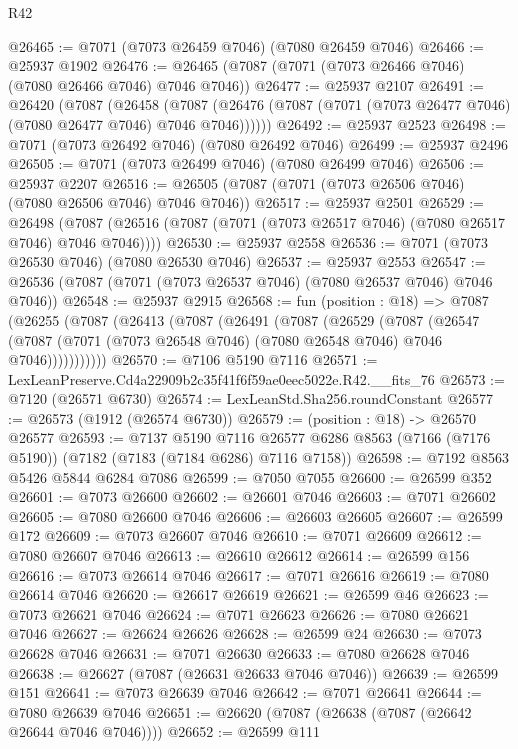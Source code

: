 \begin{lexlean}{R42}
\begin{coremodule}
{@26465 := @7071 (@7073 @26459 @7046) (@7080 @26459 @7046)
@26466 := @25937 @1902
@26476 := @26465 (@7087 (@7071 (@7073 @26466 @7046) (@7080 @26466 @7046) @7046 @7046))
@26477 := @25937 @2107
@26491 := @26420
    (@7087
      (@26458
        (@7087 (@26476 (@7087 (@7071 (@7073 @26477 @7046) (@7080 @26477 @7046) @7046 @7046))))))
@26492 := @25937 @2523
@26498 := @7071 (@7073 @26492 @7046) (@7080 @26492 @7046)
@26499 := @25937 @2496
@26505 := @7071 (@7073 @26499 @7046) (@7080 @26499 @7046)
@26506 := @25937 @2207
@26516 := @26505 (@7087 (@7071 (@7073 @26506 @7046) (@7080 @26506 @7046) @7046 @7046))
@26517 := @25937 @2501
@26529 := @26498
    (@7087 (@26516 (@7087 (@7071 (@7073 @26517 @7046) (@7080 @26517 @7046) @7046 @7046))))
@26530 := @25937 @2558
@26536 := @7071 (@7073 @26530 @7046) (@7080 @26530 @7046)
@26537 := @25937 @2553
@26547 := @26536 (@7087 (@7071 (@7073 @26537 @7046) (@7080 @26537 @7046) @7046 @7046))
@26548 := @25937 @2915
@26568 := fun (position : @18) =>
  @7087
    (@26255
      (@7087
        (@26413
          (@7087
            (@26491
              (@7087
                (@26529
                  (@7087
                    (@26547
                      (@7087 (@7071 (@7073 @26548 @7046) (@7080 @26548 @7046) @7046 @7046)))))))))))
@26570 := @7106 @5190 @7116
@26571 := LexLeanPreserve.Cd4a22909b2c35f41f6f59ae0eec5022e.R42.__fits_76
@26573 := @7120 (@26571 @6730)
@26574 := LexLeanStd.Sha256.roundConstant
@26577 := @26573 (@1912 (@26574 @6730))
@26579 := (position : @18) -> @26570 @26577
@26593 := @7137
    @5190
    @7116
    @26577
    @6286
    @8563
    (@7166 (@7176 @5190))
    (@7182 (@7183 (@7184 @6286) @7116 @7158))
@26598 := @7192 @8563 @5426 @5844 @6284 @7086
@26599 := @7050 @7055
@26600 := @26599 @352
@26601 := @7073 @26600
@26602 := @26601 @7046
@26603 := @7071 @26602
@26605 := @7080 @26600 @7046
@26606 := @26603 @26605
@26607 := @26599 @172
@26609 := @7073 @26607 @7046
@26610 := @7071 @26609
@26612 := @7080 @26607 @7046
@26613 := @26610 @26612
@26614 := @26599 @156
@26616 := @7073 @26614 @7046
@26617 := @7071 @26616
@26619 := @7080 @26614 @7046
@26620 := @26617 @26619
@26621 := @26599 @46
@26623 := @7073 @26621 @7046
@26624 := @7071 @26623
@26626 := @7080 @26621 @7046
@26627 := @26624 @26626
@26628 := @26599 @24
@26630 := @7073 @26628 @7046
@26631 := @7071 @26630
@26633 := @7080 @26628 @7046
@26638 := @26627 (@7087 (@26631 @26633 @7046 @7046))
@26639 := @26599 @151
@26641 := @7073 @26639 @7046
@26642 := @7071 @26641
@26644 := @7080 @26639 @7046
@26651 := @26620 (@7087 (@26638 (@7087 (@26642 @26644 @7046 @7046))))
@26652 := @26599 @111
}
\end{coremodule}
\end{lexlean}
